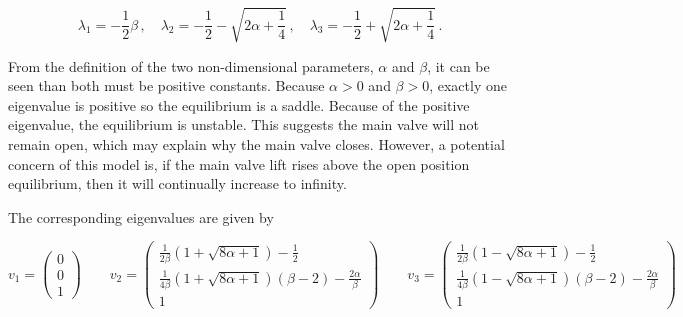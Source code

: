 \begin{equation*}
\lambda_1 = - \frac{1}{2} \beta \, , \quad
\lambda_2 = - \frac{1}{2} - \sqrt{2 \alpha + \frac{1}{4}} \, , \quad \lambda_3 = - \frac{1}{2} + \sqrt{2 \alpha + \frac{1}{4}} \, .
\end{equation*}

From the definition of the two non-dimensional parameters, $\alpha$ and $\beta$, it can be seen than both must be positive constants. Because $\alpha > 0$ and $\beta > 0$, exactly one eigenvalue is positive so the equilibrium is a saddle. Because of the positive eigenvalue, the equilibrium is unstable. This suggests the main valve will not remain open, which may explain why the main valve closes. However, a potential concern of this model is, if the main valve lift rises above the open position equilibrium, then it will continually increase to infinity.

The corresponding eigenvalues are given by

\begin{equation*}
    v_1 = \begin{pmatrix}
    0 \\ 0 \\ 1
    \end{pmatrix} \qquad
    v_2 = \begin{pmatrix}
    \frac{1}{2\beta} \left( 1 + \sqrt{8\alpha+1} \right) - \frac{1}{2} \\ \frac{1}{4\beta} \left( 1 + \sqrt{8\alpha+1} \right) \left( \beta - 2 \right) - \frac{2\alpha}{\beta} \\ 1
    \end{pmatrix} \qquad
    v_3 = \begin{pmatrix}
    \frac{1}{2\beta} \left( 1 - \sqrt{8\alpha+1} \right) - \frac{1}{2} \\ \frac{1}{4\beta} \left( 1 - \sqrt{8\alpha+1} \right) \left( \beta - 2 \right) - \frac{2\alpha}{\beta} \\ 1
    \end{pmatrix}
\end{equation*}

